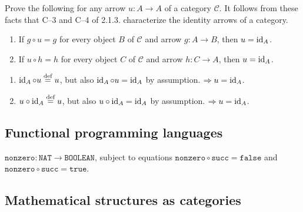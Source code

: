 \begin{exercise}
    Prove the following for any arrow \(u : A \to A\) of a category \(\mathcal{C}\). It follows from these facts that C--3 and C--4 of 2.1.3. characterize the identity arrows of a category.
    \begin{enumerate}
        \item If \(g \circ u = g\) for every object \(B\) of \(\mathcal{C}\) and arrow \(g : A \to B\), then \(u = \operatorname{id}_A\).
        \item If \(u \circ h = h\) for every object \(C\) of \(\mathcal{C}\) and arrow \(h : C \to A\), then \(u = \operatorname{id}_A\).
    \end{enumerate}
\end{exercise}
\begin{solution}\itemfix
    \begin{enumerate}
        \item \(\operatorname{id}_A \circ u \stackrel{\text{def}}{=} u\), but also \(\operatorname{id}_A \circ u = \operatorname{id}_A\) by assumption. \(\Rightarrow u = \operatorname{id}_A\).
        \item \(u \circ \operatorname{id}_A \stackrel{\text{def}}{=} u\), but also \(u \circ \operatorname{id}_A = \operatorname{id}_A\) by assumption. \(\Rightarrow u = \operatorname{id}_A\).
    \end{enumerate}
\end{solution}

\subsection{Functional programming languages}

\begin{exercise}
    \(\texttt{nonzero}: \texttt{NAT} \to \texttt{BOOLEAN}\), subject to equations \(\texttt{nonzero} \circ \texttt{succ} = \texttt{false}\) and \(\texttt{nonzero} \circ \texttt{succ} = \texttt{true}\).
\end{exercise}

\subsection{Mathematical structures as categories}

